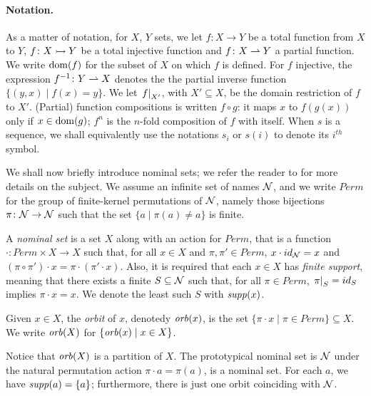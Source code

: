 \paragraph{Notation.} As a matter of notation, for $X$, $Y$ sets, we let $f \colon X \to Y$ be a total function from $X$ to $Y$, $f \colon X \rightarrowtail Y$ be a total injective function and $f \colon X \rightharpoonup Y$ a partial function. We write $\operatorname{dom}(f)$ for the subset of $X$ on which $f$ is defined. For $f$ injective, the expression $f^{-1} \colon Y \rightharpoonup X$ denotes the the partial inverse function $\{(y,x) \mid f(x) = y \}$. We let $\left.f\right|_{X'}$, with $X' \subseteq X$, be the domain restriction of $f$ to $X'$. (Partial) function compositions is written $f \circ g$: it maps $x$ to $f(g(x))$ only if $x \in \operatorname{dom}(g)$; $f^n$ is the $n$-fold composition of $f$ with itself. When $s$ is a sequence, we shall equivalently use the notations $s_i$ or $s(i)$ to denote its $i^{\mathit{th}}$ symbol.

We shall now briefly introduce nominal sets; we refer the reader to \cite{GabbayPitts?} for more details on the subject. We assume an infinite set of names $\mathcal{N}$, and we write $Perm$ for the group of finite-kernel permutations of $\mathcal{N}$, namely those bijections $\pi \colon \mathcal{N} \to \mathcal{N}$ such that the set $\{ a \mid \pi(a) \neq a \}$ is finite.
\begin{definition}
A \emph{nominal set} is a set $X$ along with an action for $Perm$, that is a function $\cdot \colon Perm \times X \to X$ such that, for all $x \in X$ and $\pi,\pi' \in Perm$, $x \cdot id_{\mathcal{N}} = x$ and $(\pi \circ \pi') \cdot x = \pi \cdot (\pi' \cdot x)$. Also, it is required that each $x \in X$ has \emph{finite support}, meaning that there exists a finite $S \subseteq \mathcal{N}$ such that, for all $\pi \in Perm$, $\left.\pi\right|_{S} = id_S$ implies $\pi \cdot x = x$. We denote the least such $S$ with $\mathit{supp}(x)$.
\end{definition}
%
\begin{definition}
Given $x \in X$, the \emph{orbit} of $x$, denotedy $\mathit{orb}(x) $, is the set $\{ \pi \cdot x \mid \pi \in Perm\} \subseteq X$. We write $\mathit{orb}(X)$ for $\{ \mathit{orb}(x) \mid x \in X\}$. 
\end{definition}

Notice that $\mathit{orb}(X)$ is a partition of $X$. The prototypical nominal set is $\mathcal{N}$ under the natural permutation action $\pi \cdot a = \pi(a)$, is a nominal set. For each $a$, we have $\mathit{supp}(a) = \{a\}$; furthermore, there is just one orbit coinciding with $\mathcal{N}$.
